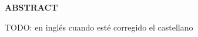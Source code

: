 
\begin{center}
{\LARGE \bfseries ABSTRACT}

\vspace{2.5cm}
\end{center}

TODO: en inglés cuando esté corregido el castellano
